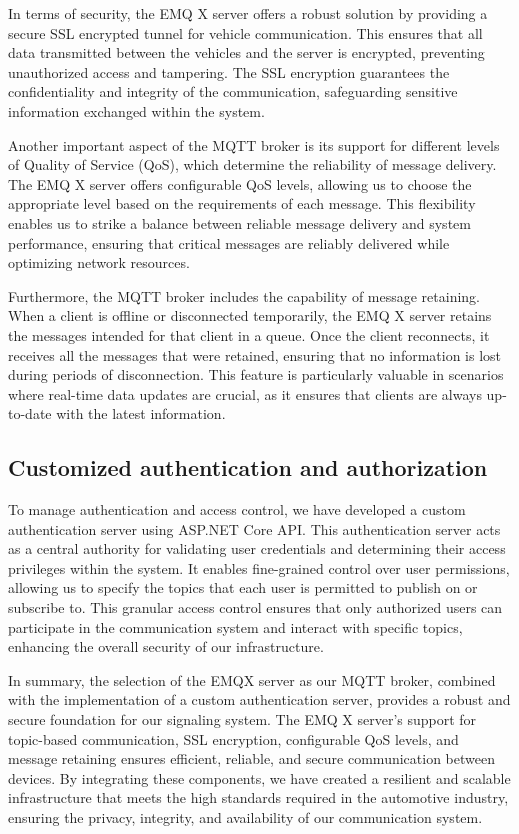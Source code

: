 \documentclass[
12pt,
oneside, 
onehalfspacing, 
nolistspacing, 
parskip, 
chapterinoneline, 
]{AASTCOMPUTER}
\begin{document}
In terms of security, the EMQ X server offers a robust solution by providing a secure SSL encrypted tunnel for vehicle communication. This ensures that all data transmitted between the vehicles and the server is encrypted, preventing unauthorized access and tampering. The SSL encryption guarantees the confidentiality and integrity of the communication, safeguarding sensitive information exchanged within the system.

Another important aspect of the MQTT broker is its support for different levels of Quality of Service (QoS), which determine the reliability of message delivery. The EMQ X server offers configurable QoS levels, allowing us to choose the appropriate level based on the requirements of each message. This flexibility enables us to strike a balance between reliable message delivery and system performance, ensuring that critical messages are reliably delivered while optimizing network resources.

Furthermore, the MQTT broker includes the capability of message retaining. When a client is offline or disconnected temporarily, the EMQ X server retains the messages intended for that client in a queue. Once the client reconnects, it receives all the messages that were retained, ensuring that no information is lost during periods of disconnection. This feature is particularly valuable in scenarios where real-time data updates are crucial, as it ensures that clients are always up-to-date with the latest information.
\subsection{Customized authentication and authorization}
To manage authentication and access control, we have developed a custom authentication server using ASP.NET Core API. This authentication server acts as a central authority for validating user credentials and determining their access privileges within the system. It enables fine-grained control over user permissions, allowing us to specify the topics that each user is permitted to publish on or subscribe to. This granular access control ensures that only authorized users can participate in the communication system and interact with specific topics, enhancing the overall security of our infrastructure.

In summary, the selection of the EMQX server as our MQTT broker, combined with the implementation of a custom authentication server, provides a robust and secure foundation for our signaling system. The EMQ X server's support for topic-based communication, SSL encryption, configurable QoS levels, and message retaining ensures efficient, reliable, and secure communication between devices. By integrating these components, we have created a resilient and scalable infrastructure that meets the high standards required in the automotive industry, ensuring the privacy, integrity, and availability of our communication system.
\end{document}
